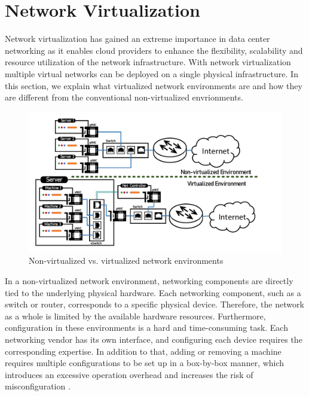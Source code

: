 \section{Network Virtualization}

Network virtualization has gained an extreme importance in data center networking
as it enables cloud providers to enhance the flexibility, scalability 
and resource utilization of the network infrastructure. With network virtualization
multiple virtual networks can be deployed on a single physical infrastructure. In this 
section, we explain what virtualized network environments are and how they are
different from the conventional non-virtualized envrionments.


\begin{figure}
    \centering
    \includegraphics[scale=0.625]{../Figures/non-virt-vs-virt.pdf}
    \caption{Non-virtualized vs. virtualized network environments}
    \label{fig:virt.vs.nonvirt}
\end{figure}



In a non-virtualized network environment, networking components are directly tied 
to the underlying physical hardware. Each networking component, such as a switch or router, 
corresponds to a specific physical device. Therefore, the network as a whole is limited by the 
available hardware resources. Furthermore, configuration in these environments is a hard and 
time-consuming task. Each networking vendor has its own interface, and configuring each 
device requires the corresponding expertise. In addition to that, adding or removing a machine 
requires multiple configurations to be set up in a box-by-box manner, which introduces 
an excessive operation overhead and increases the risk of misconfiguration 
\cite{cearley2013top, marty2019snap}.

